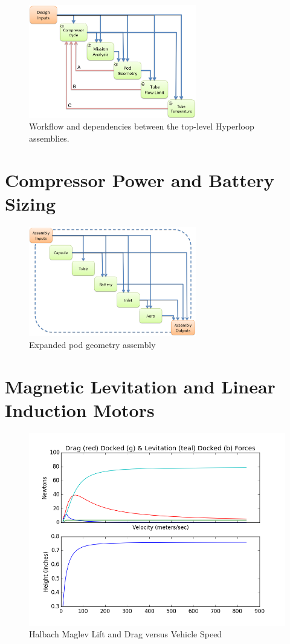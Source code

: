 \documentclass[heading.tex]{subfiles}
\begin{document}
	\begin{figure}[hbtp]
		\centering
		\includegraphics[width=0.65\textwidth]{images/TopAssembly.png}
		\caption{Workflow and dependencies between the top-level Hyperloop assemblies.}
		\label{f:hyperloopXDSM}
	\end{figure}

\section{Compressor Power and Battery Sizing}

	\begin{figure}[hbtp]
		\centering
		\includegraphics[width=0.65\textwidth]{images/podAssembly.png}
		\caption{Expanded pod geometry assembly}
		\label{f:podXDSM}
	\end{figure}

\section{Magnetic Levitation and Linear Induction Motors}

	\begin{figure}[hbtp]
		\centering
		\includegraphics[width=.75\textwidth]{images/halbach0.png}
		\caption[h0]{Halbach Maglev Lift and Drag versus Vehicle Speed}
		\label{f:h0}
	\end{figure}
\end{document}
